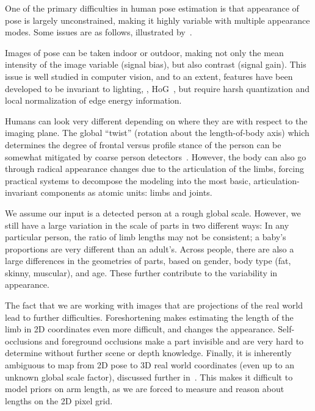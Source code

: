 One of the primary difficulties in human pose estimation is that appearance of 
pose is largely unconstrained, making it highly variable with multiple 
appearance modes.  Some issues are as follows, illustrated 
by~.

 Images of pose can be taken indoor or outdoor, making not 
only the mean intensity of the image variable (signal bias), but also contrast 
(signal gain). This issue is well studied in computer vision, and to an extent, 
features have been developed to be invariant to lighting, \eg, HoG~\citep{hog}, 
but require harsh quantization and local normalization of edge energy 
information. 

 Humans can look very different depending on where 
they are with respect to the imaging plane.  The global ``twist'' (rotation 
about the length-of-body axis) which determines the degree of frontal versus 
profile stance of the person can be somewhat mitigated by coarse person 
detectors~\citep{andriluka2010}.  However, the body can also go through radical 
appearance changes due to the articulation of the limbs, forcing practical 
systems to decompose the modeling into the most basic, articulation-invariant 
components as atomic units: limbs and joints.

 We assume our input is a detected person at a rough 
global scale.  However, we still have a large variation in the scale of parts 
in two different ways: In any particular person, the ratio of limb lengths may 
not be consistent; \eg a baby's proportions are very different than an adult's.  
Across people, there are also a large differences in the geometries of parts, 
based on gender, body type (fat, skinny, muscular), and age.  These further 
contribute to the variability in appearance.

 The fact that we are working with images that are 
projections of the real world lead to further difficulties.  Foreshortening 
makes estimating the length of the limb in 2D coordinates even more difficult, 
and changes the appearance.  Self-occlusions and foreground occlusions make a 
part invisible and are very hard to determine without further scene or depth 
knowledge.  Finally, it is inherently ambiguous to map from 2D pose to 3D real 
world coordinates (even up to an unknown global scale factor), discussed 
further in~.  This makes it difficult to model priors on 
arm length, as we are forced to measure and reason about lengths on the 2D 
pixel grid.


